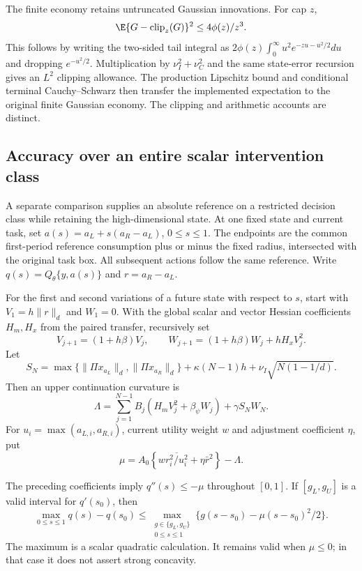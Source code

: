 The finite economy retains untruncated Gaussian innovations. For cap $z$,
\[
 \E\{G-\operatorname{clip}_{z}(G)\}^2
       \leq 4\phi(z)/z^3.
\]
This follows by writing the two-sided tail integral as
$2\phi(z)\int_0^\infty u^2e^{-zu-u^2/2}du$ and dropping
$e^{-u^2/2}$. Multiplication by $\nu_I^2+\nu_C^2$ and the
same state-error recursion gives an $L^2$ clipping allowance. The
production Lipschitz bound and conditional terminal Cauchy--Schwarz
then transfer the implemented expectation to the original finite
Gaussian economy. The clipping and arithmetic accounts are distinct.

\subsection{Accuracy over an entire scalar intervention class}
\label{app:r16menuaccuracy}

A separate comparison supplies an absolute reference on a restricted
decision class while retaining the high-dimensional state. At one fixed
state and current task, set $a(s)=a_L+s(a_R-a_L)$, $0\leq s\leq1$.
The endpoints are the common first-period reference consumption plus
or minus the fixed radius, intersected with the original task box.
All subsequent actions follow the same reference. Write
$q(s)=Q_\theta\{y,a(s)\}$ and $r=a_R-a_L$.

For the first and second variations of a future state with respect to
$s$, start with $V_1=h\|r\|_d$ and $W_1=0$. With the global
scalar and vector Hessian coefficients $H_m,H_x$ from the paired
transfer, recursively set
\[
 V_{j+1}=(1+h\beta)V_j,\qquad
 W_{j+1}=(1+h\beta)W_j+hH_xV_j^2.
\]
Let
\[
 S_N=\max\{\|\Pi x_{a_L}\|_d,\|\Pi x_{a_R}\|_d\}
          +\kappa(N-1)h+\nu_I\sqrt{N(1-1/d)}.
\]
Then an upper continuation curvature is
\[
 \Lambda=\sum_{j=1}^{N-1}B_j(H_mV_j^2+\beta_\psi W_j)
                                         +\gamma S_NW_N.
\]
For $u_i=\max(a_{L,i},a_{R,i})$, current utility weight $w$ and
adjustment coefficient $\eta$, put
\[
 \mu=A_0\left\{w\overline{r_i^2/u_i^2}+\eta\bar r^2\right\}-\Lambda.
\]

\begin{proposition}
\label{prop:r16menugap}
The preceding coefficients imply $q''(s)\leq-\mu$ throughout
$[0,1]$. If $[g_L,g_U]$ is a valid interval for $q'(s_0)$, then
\[
 \max_{0\leq s\leq1}q(s)-q(s_0)
 \leq\max_{\substack{g\in\{g_L,g_U\}\\0\leq s\leq1}}
           \{g(s-s_0)-\mu(s-s_0)^2/2\}.
\]
The maximum is a scalar quadratic calculation. It remains valid when
$\mu\leq0$; in that case it does not assert strong concavity.
\end{proposition}


